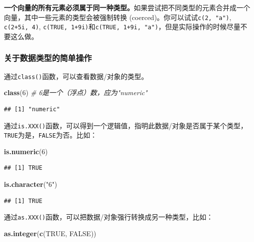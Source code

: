 \documentclass[]{book}
\newenvironment{Shaded}{\begin{snugshade}}{\end{snugshade}}
\newcommand{\CommentTok}[1]{\textcolor[rgb]{0.56,0.35,0.01}{\textit{#1}}}
\newcommand{\DecValTok}[1]{\textcolor[rgb]{0.00,0.00,0.81}{#1}}
\newcommand{\KeywordTok}[1]{\textcolor[rgb]{0.13,0.29,0.53}{\textbf{#1}}}
\newcommand{\NormalTok}[1]{#1}
\newcommand{\OtherTok}[1]{\textcolor[rgb]{0.56,0.35,0.01}{#1}}
\newcommand{\StringTok}[1]{\textcolor[rgb]{0.31,0.60,0.02}{#1}}
\begin{document}
\textbf{一个向量的所有元素必须属于同一种类型。}如果尝试把不同类型的元素合并成一个向量，其中一些元素的类型会被强制转换 (coerced)。你可以试试\texttt{c(2,\ "a")}, \texttt{c(2+5i,\ 4)}, \texttt{c(TRUE,\ 1+9i)}和\texttt{c(TRUE,\ 1+9i,\ "a")}，但是实际操作的时候尽量不要这么做。

\hypertarget{data-types-simple-operations}{%
\subsubsection{关于数据类型的简单操作}\label{data-types-simple-operations}}

通过\texttt{class()}函数，可以查看数据/对象的类型。

\begin{Shaded}
\begin{Highlighting}[]
\KeywordTok{class}\NormalTok{(}\DecValTok{6}\NormalTok{) }\CommentTok{# 6是一个（浮点）数，应为"numeric"}
\end{Highlighting}
\end{Shaded}

\begin{verbatim}
## [1] "numeric"
\end{verbatim}

通过\texttt{is.XXX()}函数，可以得到一个逻辑值，指明此数据/对象是否属于某个类型，\texttt{TRUE}为是，\texttt{FALSE}为否。比如：

\begin{Shaded}
\begin{Highlighting}[]
\KeywordTok{is.numeric}\NormalTok{(}\DecValTok{6}\NormalTok{)}
\end{Highlighting}
\end{Shaded}

\begin{verbatim}
## [1] TRUE
\end{verbatim}

\begin{Shaded}
\begin{Highlighting}[]
\KeywordTok{is.character}\NormalTok{(}\StringTok{"6"}\NormalTok{)}
\end{Highlighting}
\end{Shaded}

\begin{verbatim}
## [1] TRUE
\end{verbatim}

通过\texttt{as.XXX()}函数，可以把数据/对象强行转换成另一种类型，比如：

\begin{Shaded}
\begin{Highlighting}[]
\KeywordTok{as.integer}\NormalTok{(}\KeywordTok{c}\NormalTok{(}\OtherTok{TRUE}\NormalTok{, }\OtherTok{FALSE}\NormalTok{))}
\end{Highlighting}
\end{Shaded}
\end{document}
